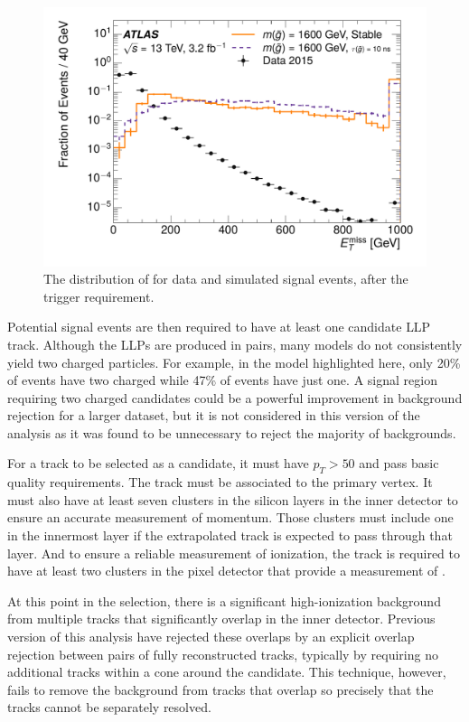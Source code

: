 \begin{figure}[h]
\centering
\includegraphics[width=\fullfig]{figures/selection_met_nm1_log.pdf}
\caption{The distribution of \met for data and simulated signal events, after the trigger requirement.}
\label{fig:nm1_met}
\end{figure}

Potential signal events are then required to have at least one candidate \ac{LLP} track.
Although the \acp{LLP} are produced in pairs, many models do not consistently yield two charged particles.
For example, in the \rhadron model highlighted here, only 20\% of events have two charged \rhadrons while 47\% of events have just one.
A signal region requiring two charged candidates could be a powerful improvement in background rejection for a larger dataset, but it is not considered in this version of the analysis as it was found to be unnecessary to reject the majority of backgrounds.

For a track to be selected as a candidate, it must have $p_T > 50$ \GeV and pass basic quality requirements. 
The track must be associated to the primary vertex.
It must also have at least seven clusters in the silicon layers in the inner detector to ensure an accurate measurement of momentum.
Those clusters must include one in the innermost layer if the extrapolated track is expected to pass through that layer.
And to ensure a reliable measurement of ionization, the track is required to have at least two clusters in the pixel detector that provide a measurement of \dedx.

At this point in the selection, there is a significant high-ionization background from multiple tracks that significantly overlap in the inner detector. 
Previous version of this analysis have rejected these overlaps by an explicit overlap rejection between pairs of fully reconstructed tracks, typically by requiring no additional tracks within a cone around the candidate. 
This technique, however, fails to remove the background from tracks that overlap so precisely that the tracks cannot be separately resolved.

